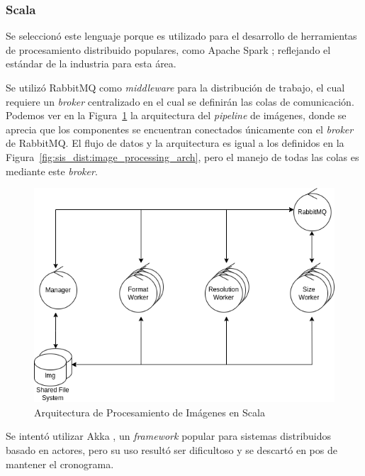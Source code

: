 \documentclass[11pt]{article}
\let\Oldsubsubsection\subsubsection
\renewcommand{\subsubsection}{\FloatBarrier\Oldsubsubsection}
\newcommand{\english}[1]{\textit{#1}}
\begin{document}
\subsubsection{Scala}

Se seleccionó este lenguaje porque es utilizado para el desarrollo de herramientas de procesamiento distribuido populares, como Apache Spark \cite{scala:ex:spark}; reflejando el estándar de la industria para esta área.

Se utilizó RabbitMQ \cite{scala:lib:rabbit} como \english{middleware} para la distribución de trabajo, el cual requiere un \english{broker} centralizado en el cual se definirán las colas de comunicación. Podemos ver en la Figura~\ref{fig:scala:image_processing_arch} la arquitectura del \english{pipeline} de imágenes, donde se aprecia que los componentes se encuentran conectados únicamente con el \english{broker} de RabbitMQ. El flujo de datos y la arquitectura es igual a los definidos en la Figura~\ref{fig:sis_dist:image_processing_arch}, pero el manejo de todas las colas es mediante este \english{broker}.

\begin{figure}[ht]
    \centering
    \includegraphics[scale=0.4]{resources/distributed_systems/scala/image_processing_arch.png}
    \caption{Arquitectura de Procesamiento de Imágenes en Scala}
    \label{fig:scala:image_processing_arch}
\end{figure}

Se intentó utilizar Akka \cite{scala:lib:akka}, un \english{framework} popular para sistemas distribuidos basado en actores, pero su uso resultó ser dificultoso y se descartó en pos de mantener el cronograma.
\end{document}
